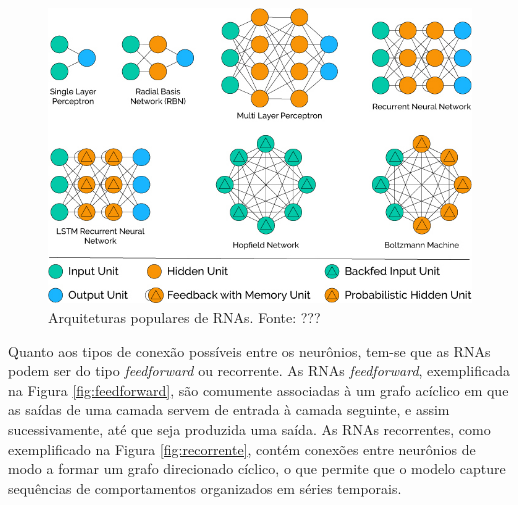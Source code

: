 \begin{figure}[!h]
	\caption{Arquiteturas populares de RNAs. Fonte: ???}
	\label{fig:popular_archs}
	\includegraphics[width=\linewidth]{img/popular_archs}
\end{figure}


Quanto aos tipos de conexão possíveis entre os neurônios, tem-se que as RNAs podem ser do tipo \emph{feedforward} ou recorrente. As RNAs \emph{feedforward}, exemplificada na Figura \ref{fig:feedforward}, são comumente associadas à um grafo acíclico em que as saídas de uma camada servem de entrada à camada seguinte, e assim sucessivamente, até que seja produzida uma saída. As RNAs recorrentes, como exemplificado na Figura \ref{fig:recorrente}, contém conexões entre neurônios de modo a formar um grafo direcionado cíclico, o que permite que o modelo capture sequências de comportamentos organizados em séries temporais.

